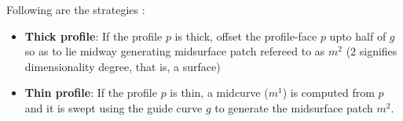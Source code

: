Following are the strategies :%
	\begin{itemize}[noitemsep,topsep=2pt,parsep=2pt,partopsep=2pt]
	\item\textbf{Thick profile}:  If the profile $p$ is thick, offset the profile-face $p$ upto half of $g$ so as to lie midway generating midsurface patch refereed to as $m^2$ ($2$ signifies dimensionality degree, that is, a surface)%
	\item \textbf{Thin profile}:  If the profile $p$ is thin, a midcurve ($m^1$) is computed from $p$ and it  is swept using the guide curve $g$ to generate the midsurface patch $m^2$.%
	\end{itemize}
%


